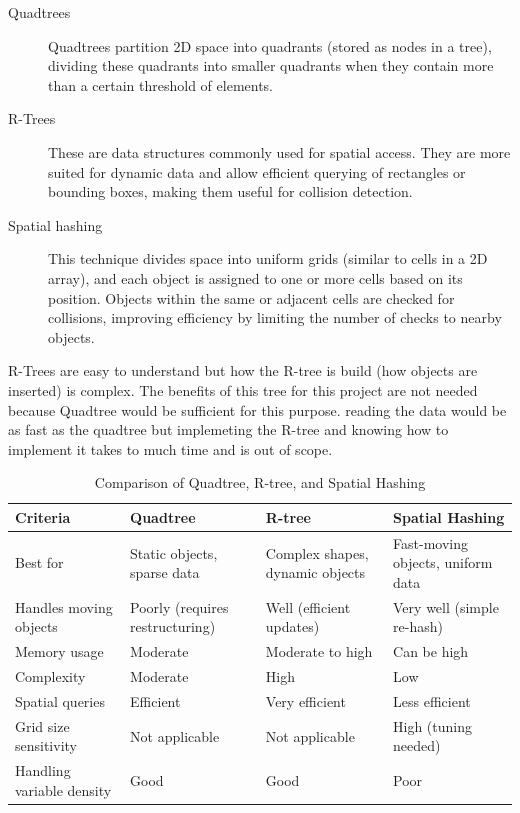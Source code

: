 \documentclass{projdoc}
\begin{document}
\begin{description}
	\item[Quadtrees] Quadtrees partition 2D space into quadrants (stored as nodes in a tree), dividing these quadrants into smaller quadrants when they contain more than a certain threshold of elements.
	\item[R-Trees] These are data structures commonly used for spatial access. They are more suited for dynamic data and allow efficient querying of rectangles or bounding boxes, making them useful for collision detection.
	\item[Spatial hashing] This technique divides space into uniform grids (similar to cells in a 2D array), and each object is assigned to one or more cells based on its position. Objects within the same or adjacent cells are checked for collisions, improving efficiency by limiting the number of checks to nearby objects.
\end{description}

R-Trees are easy to understand but how the R-tree is build (how objects are inserted) is complex. The benefits of this tree for this project are not needed because Quadtree would be sufficient for this purpose. reading the data would be as fast as the quadtree but implemeting the R-tree and knowing how to implement it takes to much time and is out of scope.


\begin{table}
    \begin{tabularx}{\linewidth}{lXl}
        \toprule
        Criteria & Quadtree & R-tree & Spatial Hashing \\
        \midrule
        Best for & Static objects, sparse data & Complex shapes, dynamic objects & Fast-moving objects, uniform data \\
        \midrule
        Handles moving objects & Poorly (requires restructuring) & Well (efficient updates) & Very well (simple re-hash) \\
        \midrule
        Memory usage & Moderate & Moderate to high & Can be high \\
        \midrule
        Complexity & Moderate & High & Low \\
        \midrule
        Spatial queries & Efficient & Very efficient & Less efficient \\
        \midrule
        Grid size sensitivity & Not applicable & Not applicable & High (tuning needed) \\
        \midrule
        Handling variable density & Good & Good & Poor \\
        \bottomrule
    \end{tabularx}
    \caption{Comparison of Quadtree, R-tree, and Spatial Hashing}
\end{table}
\end{document}
